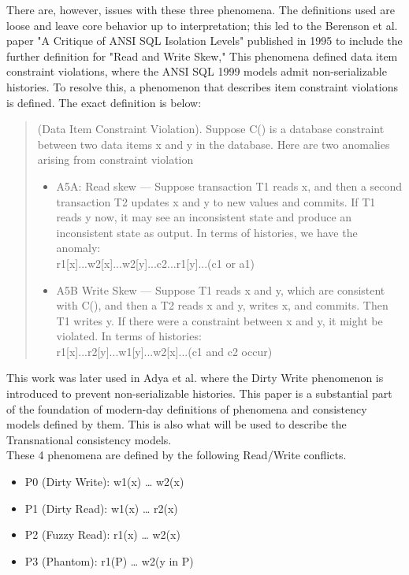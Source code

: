 \documentclass[a4paper,10pt,titlepage]{report}
\begin{document}
There are, however, issues with these three phenomena. The definitions used are loose and leave core behavior up to interpretation; this led to the Berenson et al. \cite{Berensonetal} paper "A Critique of ANSI SQL Isolation Levels" published in 1995 to include the further definition for "Read and Write Skew," This phenomena defined data item constraint violations, where the ANSI SQL 1999\cite{ansisql1999} models admit non-serializable histories. To resolve this, a phenomenon that describes item constraint violations is defined. The exact definition is below: \\
\begin{quote}
    (Data Item Constraint Violation). Suppose C() is a database constraint between two data items x and y in the database. Here are two anomalies arising from constraint violation
\begin{itemize}
\item A5A: Read skew — Suppose transaction T1 reads x, and then a second transaction T2 updates x and y to new values and commits. If T1 reads y now, it may see an inconsistent state and produce an inconsistent state as output.
In terms of histories, we have the anomaly:   \\
 r1[x]...w2[x]...w2[y]...c2...r1[y]...(c1 or a1)
 
\item A5B Write Skew — Suppose T1 reads x and y, which are
consistent with C(), and then a T2 reads x and y, writes x,
    and commits. Then T1 writes y. If there were a constraint
    between x and y, it might be violated. In terms of histories: \\
r1[x]...r2[y]...w1[y]...w2[x]...(c1 and c2 occur)
    
\end{itemize}
\end{quote}

This work was later used in Adya et al. \cite{Adya99weakconsistency} where the Dirty Write phenomenon is introduced to prevent non-serializable histories. This paper is a substantial part of the foundation of modern-day definitions of phenomena and consistency models defined by them. This is also what will be used to describe the Transnational consistency models.\\

These 4 phenomena are defined by the following Read/Write conflicts.
\begin{itemize}
    \item P0 (Dirty Write): w1(x) … w2(x)
    \item P1 (Dirty Read): w1(x) … r2(x)
    \item P2 (Fuzzy Read): r1(x) … w2(x)
    \item P3 (Phantom): r1(P) … w2(y in P)
\end{itemize}
\end{document}
